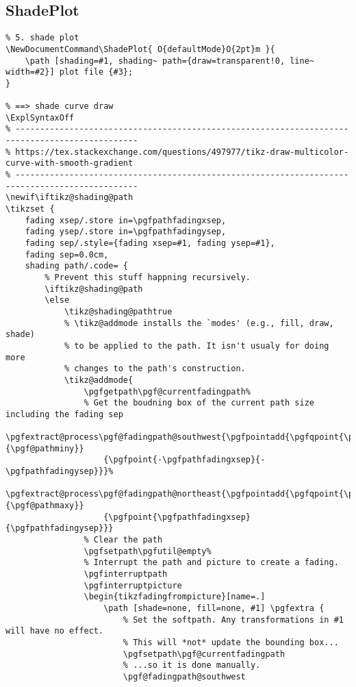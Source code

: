 \subsection{ShadePlot}
\begin{verbatim}
% 5. shade plot
\NewDocumentCommand\ShadePlot{ O{defaultMode}O{2pt}m }{
    \path [shading=#1, shading~ path={draw=transparent!0, line~ width=#2}] plot file {#3};
}

% ==> shade curve draw
\ExplSyntaxOff
% -----------------------------------------------------------------------------------------------
% https://tex.stackexchange.com/questions/497977/tikz-draw-multicolor-curve-with-smooth-gradient
% -----------------------------------------------------------------------------------------------
\newif\iftikz@shading@path
\tikzset {
    fading xsep/.store in=\pgfpathfadingxsep,
    fading ysep/.store in=\pgfpathfadingysep,
    fading sep/.style={fading xsep=#1, fading ysep=#1},
    fading sep=0.0cm,
    shading path/.code= {
        % Prevent this stuff happning recursively.
        \iftikz@shading@path
        \else
            \tikz@shading@pathtrue
            % \tikz@addmode installs the `modes' (e.g., fill, draw, shade) 
            % to be applied to the path. It isn't usualy for doing more
            % changes to the path's construction.
            \tikz@addmode{
                \pgfgetpath\pgf@currentfadingpath%
                % Get the boudning box of the current path size including the fading sep
                \pgfextract@process\pgf@fadingpath@southwest{\pgfpointadd{\pgfqpoint{\pgf@pathminx}{\pgf@pathminy}}
                    {\pgfpoint{-\pgfpathfadingxsep}{-\pgfpathfadingysep}}}%
                \pgfextract@process\pgf@fadingpath@northeast{\pgfpointadd{\pgfqpoint{\pgf@pathmaxx}{\pgf@pathmaxy}}
                    {\pgfpoint{\pgfpathfadingxsep}{\pgfpathfadingysep}}}
                % Clear the path
                \pgfsetpath\pgfutil@empty%                         
                % Interrupt the path and picture to create a fading.
                \pgfinterruptpath
                \pgfinterruptpicture
                \begin{tikzfadingfrompicture}[name=.]
                    \path [shade=none, fill=none, #1] \pgfextra {
                        % Set the softpath. Any transformations in #1 will have no effect.
                        % This will *not* update the bounding box...
                        \pgfsetpath\pgf@currentfadingpath
                        % ...so it is done manually.
                        \pgf@fadingpath@southwest

\end{verbatim}
